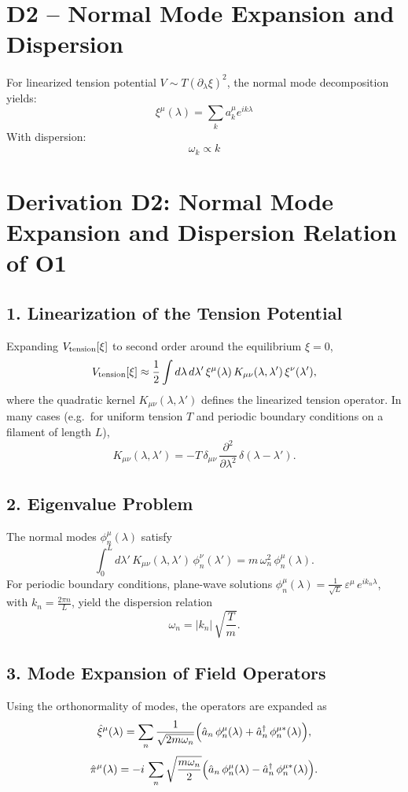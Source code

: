 
\section*{D2 – Normal Mode Expansion and Dispersion}
For linearized tension potential \( V \sim T (\partial_\lambda \xi)^2 \), the normal mode decomposition yields:
\[
\xi^\mu(\lambda) = \sum_k a_k^\mu e^{ik\lambda}
\]
With dispersion:
\[
\omega_k \propto k
\]


\section*{Derivation D2: Normal Mode Expansion and Dispersion Relation of O1}
\subsection*{1. Linearization of the Tension Potential}
Expanding \(V_{\rm tension}[\xi]\) to second order around the equilibrium \(\xi=0\),
\[
V_{\rm tension}[\xi] \approx \frac{1}{2} \int d\lambda\,d\lambda'\,\xi^\mu(\lambda)\,K_{\mu\nu}(\lambda,\lambda')\,\xi^\nu(\lambda'),
\]
where the quadratic kernel \(K_{\mu\nu}(\lambda,\lambda')\) defines the linearized tension operator.
In many cases (e.g.\ for uniform tension \(T\) and periodic boundary conditions on a filament of length \(L\)),
\[
K_{\mu\nu}(\lambda,\lambda') = -T\,\delta_{\mu\nu}\,\frac{\partial^2}{\partial\lambda^2}\,\delta(\lambda-\lambda').
\]

\subsection*{2. Eigenvalue Problem}
The normal modes \(\phi_n^\mu(\lambda)\) satisfy
\[
\int_0^L d\lambda'\,K_{\mu\nu}(\lambda,\lambda')\,\phi_n^\nu(\lambda')
= m\,\omega_n^2\,\phi_n^\mu(\lambda).
\]
For periodic boundary conditions, plane-wave solutions
\(\phi_n^\mu(\lambda)=\frac{1}{\sqrt{L}}\,\varepsilon^\mu\,e^{ik_n\lambda}\),
with \(k_n=\frac{2\pi n}{L}\), yield the dispersion relation
\[
\omega_n = |k_n|\,\sqrt{\frac{T}{m}}.
\]

\subsection*{3. Mode Expansion of Field Operators}
Using the orthonormality of modes, the operators are expanded as
\[
\hat{\xi}^\mu(\lambda) = \sum_n \frac{1}{\sqrt{2m\omega_n}}\Bigl(\hat{a}_n\,\phi_n^\mu(\lambda)
+\hat{a}_n^\dagger\,\phi_n^{\mu*}(\lambda)\Bigr),
\]
\[
\hat{\pi}^\mu(\lambda) = -i\,\sum_n \sqrt{\frac{m\omega_n}{2}}\Bigl(\hat{a}_n\,\phi_n^\mu(\lambda)
-\hat{a}_n^\dagger\,\phi_n^{\mu*}(\lambda)\Bigr).
\]

